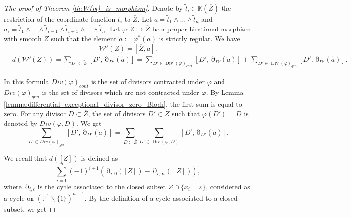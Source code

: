 \documentclass[12pt]{extarticle}
\def\mb{\mathbb}
\def\mc{\mathcal}
\def\k{\mb K}
\def\ph{\varphi}
\def\ol{\overline}
\def\wt{\widetilde}
\def\wdw{\wedge\dots\wedge}
\def\bs{\backslash}
\DeclareMathOperator{\ts}{\partial}
\DeclareMathOperator{\Div}{Div}
\begin{document}
\begin{proof}[The proof of Theorem \ref{th:W(m)_is_morphism}]
    Denote by $\wt t_i\in\k(\ol Z)$ the restriction of the coordinate function $t_i$ to $\ol Z$. Let $a=\wt t_1\wdw \wt t_n$ and $a_i = \wt t_1\wdw \wt t_{i-1}\wedge \wt t_{i+1}\wdw \wt t_n$. Let  $\ph\colon \wt Z\to \overline Z$ be a proper birational morphism with smooth $\wt Z$ such that the element $\wt a:=\ph^*(a)$ is strictly regular. We have
    $$\mc W'(Z)=[\overline Z,a].$$
    \begin{align*}
        &d(\mc W'(Z))=\sum\limits_{D'\subset \wt Z}[D',\ts_{D'}(\wt a)]=\sum\limits_{D'\in \Div(\ph)_{cont}}[D',\ts_{D'}(\wt a)]+\sum\limits_{D'\in \Div(\ph)_{gen}}[D',\ts_{D'}(\wt a)].
    \end{align*}


    In this formula $Div(\ph)_{cont}$ is the set of divisors contracted under $\ph$ and $Div(\ph)_{gen}$ is the set of  divisors which are not contracted under $\ph$. By Lemma \ref{lemma:differential_exceptional_divisor_zero_Bloch}, the first sum is equal to zero. For any divisor $D\subset \overline Z$, the set of divisors $D'\subset \wt Z$ such that $\ph(D')=D$ is denoted by $Div(\ph, D)$. We get
    $$\sum\limits_{D'\in Div(\ph)_{gen}}[D',\ts_{D'}(\wt a)]=\sum\limits_{D\subset \overline Z}\sum\limits_{D'\in \Div(\ph, D)}[D',\ts_{D'}(\wt a)].$$

We recall that $d([Z])$ is defined as
$$\sum_{i=1}^n(-1)^{i+1}(\ts_{i,0}([Z])-\ts_{i,\infty}([Z])),$$
where $\ts_{i,\varepsilon}$ is the cycle associated to the closed subset $Z\cap\{x_i=\varepsilon\}$, considered as a cycle on $(\mb P^1\bs\{1\})^{n-1}$. By the definition of a cycle associated to a closed subset, we get


\end{proof}
\end{document}
